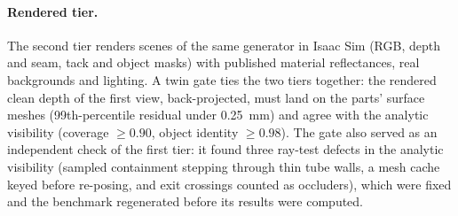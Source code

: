 
\paragraph{Rendered tier.} The second tier renders scenes of the same generator in Isaac Sim
(RGB, depth and seam, tack and object masks) with published material reflectances, real
backgrounds and lighting. A twin gate ties the two tiers together: the rendered clean depth
of the first view, back-projected, must land on the parts' surface meshes (99th-percentile
residual under 0.25~mm) and agree with the analytic visibility (coverage $\ge0.90$, object identity
$\ge0.98$). The gate also served as an independent check of the first tier: it found three
ray-test defects in the analytic visibility (sampled containment stepping through thin tube
walls, a mesh cache keyed before re-posing, and exit crossings counted as occluders), which
were fixed and the benchmark regenerated before its results were computed.

